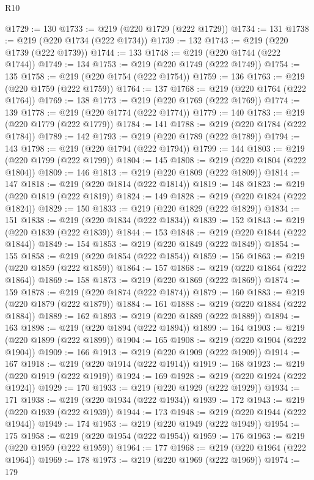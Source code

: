 \begin{lexlean}{R10}
\begin{coremodule}
@1729 := 130
@1733 := @219 (@220 @1729 (@222 @1729))
@1734 := 131
@1738 := @219 (@220 @1734 (@222 @1734))
@1739 := 132
@1743 := @219 (@220 @1739 (@222 @1739))
@1744 := 133
@1748 := @219 (@220 @1744 (@222 @1744))
@1749 := 134
@1753 := @219 (@220 @1749 (@222 @1749))
@1754 := 135
@1758 := @219 (@220 @1754 (@222 @1754))
@1759 := 136
@1763 := @219 (@220 @1759 (@222 @1759))
@1764 := 137
@1768 := @219 (@220 @1764 (@222 @1764))
@1769 := 138
@1773 := @219 (@220 @1769 (@222 @1769))
@1774 := 139
@1778 := @219 (@220 @1774 (@222 @1774))
@1779 := 140
@1783 := @219 (@220 @1779 (@222 @1779))
@1784 := 141
@1788 := @219 (@220 @1784 (@222 @1784))
@1789 := 142
@1793 := @219 (@220 @1789 (@222 @1789))
@1794 := 143
@1798 := @219 (@220 @1794 (@222 @1794))
@1799 := 144
@1803 := @219 (@220 @1799 (@222 @1799))
@1804 := 145
@1808 := @219 (@220 @1804 (@222 @1804))
@1809 := 146
@1813 := @219 (@220 @1809 (@222 @1809))
@1814 := 147
@1818 := @219 (@220 @1814 (@222 @1814))
@1819 := 148
@1823 := @219 (@220 @1819 (@222 @1819))
@1824 := 149
@1828 := @219 (@220 @1824 (@222 @1824))
@1829 := 150
@1833 := @219 (@220 @1829 (@222 @1829))
@1834 := 151
@1838 := @219 (@220 @1834 (@222 @1834))
@1839 := 152
@1843 := @219 (@220 @1839 (@222 @1839))
@1844 := 153
@1848 := @219 (@220 @1844 (@222 @1844))
@1849 := 154
@1853 := @219 (@220 @1849 (@222 @1849))
@1854 := 155
@1858 := @219 (@220 @1854 (@222 @1854))
@1859 := 156
@1863 := @219 (@220 @1859 (@222 @1859))
@1864 := 157
@1868 := @219 (@220 @1864 (@222 @1864))
@1869 := 158
@1873 := @219 (@220 @1869 (@222 @1869))
@1874 := 159
@1878 := @219 (@220 @1874 (@222 @1874))
@1879 := 160
@1883 := @219 (@220 @1879 (@222 @1879))
@1884 := 161
@1888 := @219 (@220 @1884 (@222 @1884))
@1889 := 162
@1893 := @219 (@220 @1889 (@222 @1889))
@1894 := 163
@1898 := @219 (@220 @1894 (@222 @1894))
@1899 := 164
@1903 := @219 (@220 @1899 (@222 @1899))
@1904 := 165
@1908 := @219 (@220 @1904 (@222 @1904))
@1909 := 166
@1913 := @219 (@220 @1909 (@222 @1909))
@1914 := 167
@1918 := @219 (@220 @1914 (@222 @1914))
@1919 := 168
@1923 := @219 (@220 @1919 (@222 @1919))
@1924 := 169
@1928 := @219 (@220 @1924 (@222 @1924))
@1929 := 170
@1933 := @219 (@220 @1929 (@222 @1929))
@1934 := 171
@1938 := @219 (@220 @1934 (@222 @1934))
@1939 := 172
@1943 := @219 (@220 @1939 (@222 @1939))
@1944 := 173
@1948 := @219 (@220 @1944 (@222 @1944))
@1949 := 174
@1953 := @219 (@220 @1949 (@222 @1949))
@1954 := 175
@1958 := @219 (@220 @1954 (@222 @1954))
@1959 := 176
@1963 := @219 (@220 @1959 (@222 @1959))
@1964 := 177
@1968 := @219 (@220 @1964 (@222 @1964))
@1969 := 178
@1973 := @219 (@220 @1969 (@222 @1969))
@1974 := 179

\end{coremodule}
\end{lexlean}
